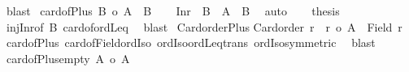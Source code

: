 \begin{isabellebody}
\ blast%
\endisatagproof
{\isafoldproof}%
%
\isadelimproof
\isanewline
%
\endisadelimproof
\isanewline
{}\isamarkupfalse%
\ card{\isacharunderscore}{\kern0pt}of{\isacharunderscore}{\kern0pt}Plus{}{\isacharcolon}{\kern0pt}\ {\isachardoublequoteopen}{\isacharbar}{\kern0pt}B{\isacharbar}{\kern0pt}\ {\isasymle}o\ {\isacharbar}{\kern0pt}A\ {\isacharless}{\kern0pt}{\isacharplus}{\kern0pt}{\isachargreater}{\kern0pt}\ B{\isacharbar}{\kern0pt}{\isachardoublequoteclose}\isanewline
%
\isadelimproof
%
\endisadelimproof
%
\isatagproof
{}\isamarkupfalse%
{\isacharminus}{\kern0pt}\isanewline
\ \ \isamarkupfalse%
\ {\isachardoublequoteopen}Inr\ {\isacharbackquote}{\kern0pt}\ B\ {\isasymle}\ A\ {\isacharless}{\kern0pt}{\isacharplus}{\kern0pt}{\isachargreater}{\kern0pt}\ B{\isachardoublequoteclose}\ \isamarkupfalse%
\ auto\isanewline
\ \ \isamarkupfalse%
\ {\isacharquery}{\kern0pt}thesis\ \isamarkupfalse%
\ inj{\isacharunderscore}{\kern0pt}Inr{\isacharbrackleft}{\kern0pt}of\ B{\isacharbrackright}{\kern0pt}\ card{\isacharunderscore}{\kern0pt}of{\isacharunderscore}{\kern0pt}ordLeq\ \isamarkupfalse%
\ blast\isanewline
{}\isamarkupfalse%
%
\endisatagproof
{\isafoldproof}%
%
\isadelimproof
\isanewline
%
\endisadelimproof
\isanewline
{}\isamarkupfalse%
\ Card{\isacharunderscore}{\kern0pt}order{\isacharunderscore}{\kern0pt}Plus{}{\isacharcolon}{\kern0pt}\isanewline
{\isachardoublequoteopen}Card{\isacharunderscore}{\kern0pt}order\ r\ {\isasymLongrightarrow}\ r\ {\isasymle}o\ {\isacharbar}{\kern0pt}A\ {\isacharless}{\kern0pt}{\isacharplus}{\kern0pt}{\isachargreater}{\kern0pt}\ {\isacharparenleft}{\kern0pt}Field\ r{\isacharparenright}{\kern0pt}{\isacharbar}{\kern0pt}{\isachardoublequoteclose}\isanewline
%
\isadelimproof
%
\endisadelimproof
%
\isatagproof
{}\isamarkupfalse%
\ card{\isacharunderscore}{\kern0pt}of{\isacharunderscore}{\kern0pt}Plus{}\ card{\isacharunderscore}{\kern0pt}of{\isacharunderscore}{\kern0pt}Field{\isacharunderscore}{\kern0pt}ordIso\ ordIso{\isacharunderscore}{\kern0pt}ordLeq{\isacharunderscore}{\kern0pt}trans\ ordIso{\isacharunderscore}{\kern0pt}symmetric\ \isamarkupfalse%
\ blast%
\endisatagproof
{\isafoldproof}%
%
\isadelimproof
\isanewline
%
\endisadelimproof
\isanewline
{}\isamarkupfalse%
\ card{\isacharunderscore}{\kern0pt}of{\isacharunderscore}{\kern0pt}Plus{\isacharunderscore}{\kern0pt}empty{}{\isacharcolon}{\kern0pt}\ {\isachardoublequoteopen}{\isacharbar}{\kern0pt}A{\isacharbar}{\kern0pt}\ {\isacharequal}{\kern0pt}o\ {\isacharbar}{\kern0pt}A\ {\isacharless}{\kern0pt}{\isacharplus}{\kern0pt}{\isachargreater}{\kern0pt}\ {\isacharbraceleft}{\kern0pt}{\isacharbraceright}{\kern0pt}{\isacharbar}{\kern0pt}{\isachardoublequoteclose}\isanewline

\end{isabellebody}
